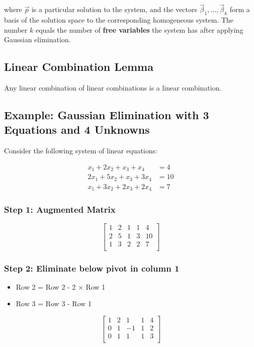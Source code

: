 where \(\vec{p}\) is a particular solution to the system, and the vectors \(\vec{\beta}_1, \ldots, \vec{\beta}_k\) form a basis of the solution space to the corresponding homogeneous system. The number \(k\) equals the number of \textbf{free variables} the system has after applying Gaussian elimination.

\subsection{Linear Combination Lemma}
Any linear combination of linear combinations is a linear combination.

\subsection{Example: Gaussian Elimination with 3 Equations and 4 Unknowns}

Consider the following system of linear equations:

\begin{align*}
	x_1 + 2x_2 + x_3 + x_4   & = 4  \\
	2x_1 + 5x_2 + x_3 + 3x_4 & = 10 \\
	x_1 + 3x_2 + 2x_3 + 2x_4 & = 7
\end{align*}

\subsubsection*{Step 1: Augmented Matrix}

\[
	\begin{bmatrix}
		1 & 2 & 1 & 1 & 4  \\
		2 & 5 & 1 & 3 & 10 \\
		1 & 3 & 2 & 2 & 7  \\
	\end{bmatrix}
\]

\subsubsection*{Step 2: Eliminate below pivot in column 1}

\begin{itemize}[label=\(-\)]
	\item Row 2 = Row 2 - 2 × Row 1
	\item Row 3 = Row 3 - Row 1
\end{itemize}

\[
	\begin{bmatrix}
		1 & 2 & 1  & 1 & 4 \\
		0 & 1 & -1 & 1 & 2 \\
		0 & 1 & 1  & 1 & 3 \\
	\end{bmatrix}
\]

